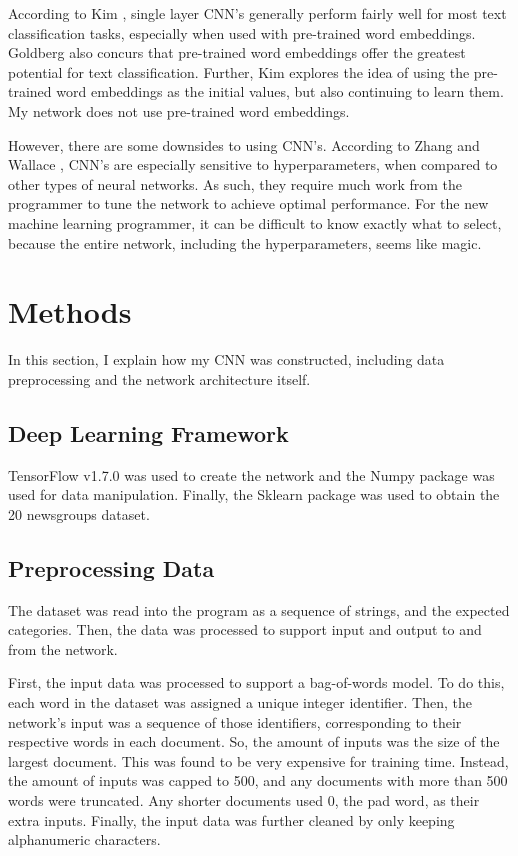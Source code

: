 \documentclass{article}
\begin{document}
According to Kim \cite{kim}, single layer CNN's generally perform fairly well for most text classification tasks, especially when used with
pre-trained word embeddings. Goldberg \cite{goldberg} also concurs that pre-trained word embeddings offer the greatest potential for text
classification. Further, Kim explores the idea of using the pre-trained word embeddings as the initial values, but also continuing to learn
them. My network does not use pre-trained word embeddings.

However, there are some downsides to using CNN's. According to Zhang and Wallace \cite{zhangwallace}, CNN's are especially sensitive to
hyperparameters, when compared to other types of neural networks. As such, they require much work from the programmer to tune the network
to achieve optimal performance. For the new machine learning programmer, it can be difficult to know exactly what to select, because the
entire network, including the hyperparameters, seems like magic.

\section{Methods}
In this section, I explain how my CNN was constructed, including data preprocessing and the network architecture itself.

\subsection{Deep Learning Framework}
TensorFlow v1.7.0 was used to create the network and the Numpy package was used for data manipulation. Finally, the Sklearn package was used
to obtain the 20 newsgroups dataset.

\subsection{Preprocessing Data}
The dataset was read into the program as a sequence of strings, and the expected categories. Then, the data was processed to support input
and output to and from the network.

First, the input data was processed to support a bag-of-words model. To do this, each word in the dataset was assigned a unique integer
identifier. Then, the network's input was a sequence of those identifiers, corresponding to their respective words in each document. So,
the amount of inputs was the size of the largest document. This was found to be very expensive for training time. Instead, the
amount of inputs was capped to 500, and any documents with more than 500 words were truncated. Any shorter documents used 0, the pad word,
as their extra inputs. Finally, the input data was further cleaned by only keeping alphanumeric characters.
\end{document}
